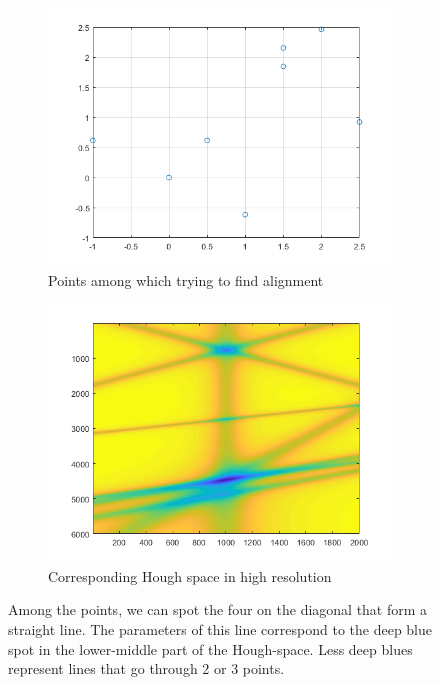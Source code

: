 \documentclass[12pt]{article}
\begin{document}
\begin{figure}[H]
	\centering
	\begin{subfigure}{.5\textwidth}
		\centering
		\includegraphics[width=\linewidth]{velout_hough_points}
		\caption{Points among which trying to find alignment}
		\label{fig_velout_hough_points}
	\end{subfigure}%
	\begin{subfigure}{.5\textwidth}
		\centering
		\includegraphics[width=\linewidth]{velout_hough_param_space}
		\caption{Corresponding Hough space in high resolution}
		\label{fig_velout_hough_param_space}
	\end{subfigure}
	\caption{Among the points, we can spot the four on the diagonal that form a straight line. The parameters of this line correspond to the deep blue spot in the lower-middle part of the Hough-space. Less deep blues represent lines that go through 2 or 3 points.}
	\label{fig_velout_branch_example}
\end{figure}
\end{document}
